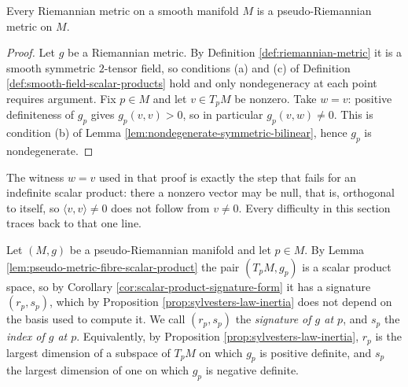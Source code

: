 \begin{proposition}
\label{prop:riemannian-is-pseudo-riemannian}
\leanok
{}
Every Riemannian metric on a smooth manifold $M$ is a pseudo-Riemannian metric on $M$.
\end{proposition}

\begin{proof}
\leanok
{}
Let $g$ be a Riemannian metric. By Definition \ref{def:riemannian-metric} it is a smooth symmetric $2$-tensor field, so conditions (a) and (c) of Definition \ref{def:smooth-field-scalar-products} hold and only nondegeneracy at each point requires argument. Fix $p \in M$ and let $v \in T_pM$ be nonzero. Take $w = v$: positive definiteness of $g_p$ gives $g_p(v,v) > 0$, so in particular $g_p(v,w) \neq 0$. This is condition (b) of Lemma \ref{lem:nondegenerate-symmetric-bilinear}, hence $g_p$ is nondegenerate.
\end{proof}

The witness $w = v$ used in that proof is exactly the step that fails for an indefinite scalar product: there a nonzero vector may be null, that is, orthogonal to itself, so $\langle v,v\rangle \neq 0$ does not follow from $v \neq 0$. Every difficulty in this section traces back to that one line.

\begin{definition}
\label{def:pseudo-metric-signature-at}
\leanok
{}
Let $(M,g)$ be a pseudo-Riemannian manifold and let $p \in M$. By Lemma \ref{lem:pseudo-metric-fibre-scalar-product} the pair $(T_pM, g_p)$ is a scalar product space, so by Corollary \ref{cor:scalar-product-signature-form} it has a signature $(r_p, s_p)$, which by Proposition \ref{prop:sylvesters-law-inertia} does not depend on the basis used to compute it. We call $(r_p,s_p)$ the \emph{signature of $g$ at $p$}, and $s_p$ the \emph{index of $g$ at $p$}. Equivalently, by Proposition \ref{prop:sylvesters-law-inertia}, $r_p$ is the largest dimension of a subspace of $T_pM$ on which $g_p$ is positive definite, and $s_p$ the largest dimension of one on which $g_p$ is negative definite.
\end{definition}

